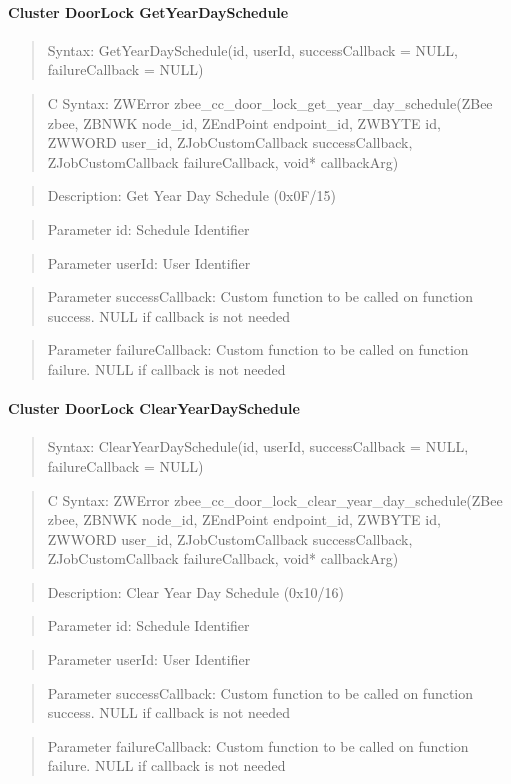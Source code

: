 \paragraph{Cluster DoorLock GetYearDaySchedule}
\begin{quote}Syntax: GetYearDaySchedule(id, userId, successCallback = NULL, failureCallback = NULL)\end{quote}
\begin{quote}C Syntax: ZWError zbee\_cc\_door\_lock\_get\_year\_day\_schedule(ZBee zbee, ZBNWK node\_id, ZEndPoint endpoint\_id, ZWBYTE id, ZWWORD user\_id, ZJobCustomCallback successCallback, ZJobCustomCallback failureCallback, void* callbackArg)\end{quote}
\begin{quote}Description: Get Year Day Schedule (0x0F/15)\end{quote}
\begin{quote}Parameter id: Schedule Identifier\end{quote}
\begin{quote}Parameter userId: User Identifier\end{quote}
\begin{quote}Parameter successCallback: Custom function to be called on function success. NULL if callback is not needed\end{quote}
\begin{quote}Parameter failureCallback: Custom function to be called on function failure. NULL if callback is not needed\end{quote}


\paragraph{Cluster DoorLock ClearYearDaySchedule}
\begin{quote}Syntax: ClearYearDaySchedule(id, userId, successCallback = NULL, failureCallback = NULL)\end{quote}
\begin{quote}C Syntax: ZWError zbee\_cc\_door\_lock\_clear\_year\_day\_schedule(ZBee zbee, ZBNWK node\_id, ZEndPoint endpoint\_id, ZWBYTE id, ZWWORD user\_id, ZJobCustomCallback successCallback, ZJobCustomCallback failureCallback, void* callbackArg)\end{quote}
\begin{quote}Description: Clear Year Day Schedule (0x10/16)\end{quote}
\begin{quote}Parameter id: Schedule Identifier\end{quote}
\begin{quote}Parameter userId: User Identifier\end{quote}
\begin{quote}Parameter successCallback: Custom function to be called on function success. NULL if callback is not needed\end{quote}
\begin{quote}Parameter failureCallback: Custom function to be called on function failure. NULL if callback is not needed\end{quote}


